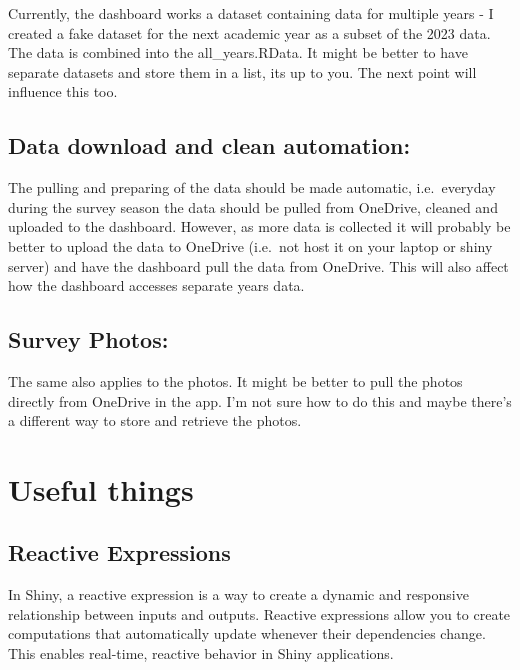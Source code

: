 \documentclass[
]{book}
\begin{document}
Currently, the dashboard works a dataset containing data for multiple years - I created a fake dataset for the next academic year as a subset of the 2023 data. The data is combined into the all\_years.RData. It might be better to have separate datasets and store them in a list, its up to you. The next point will influence this too.

\hypertarget{data-download-and-clean-automation}{%
\section{Data download and clean automation:}\label{data-download-and-clean-automation}}

The pulling and preparing of the data should be made automatic, i.e.~everyday during the survey season the data should be pulled from OneDrive, cleaned and uploaded to the dashboard. However, as more data is collected it will probably be better to upload the data to OneDrive (i.e.~not host it on your laptop or shiny server) and have the dashboard pull the data from OneDrive. This will also affect how the dashboard accesses separate years data.

\hypertarget{survey-photos}{%
\section{Survey Photos:}\label{survey-photos}}

The same also applies to the photos. It might be better to pull the photos directly from OneDrive in the app. I'm not sure how to do this and maybe there's a different way to store and retrieve the photos.

\hypertarget{useful-things}{%
\chapter{Useful things}\label{useful-things}}

\hypertarget{reactive-expressions}{%
\section{Reactive Expressions}\label{reactive-expressions}}

In Shiny, a reactive expression is a way to create a dynamic and responsive relationship between inputs and outputs. Reactive expressions allow you to create computations that automatically update whenever their dependencies change. This enables real-time, reactive behavior in Shiny applications.
\end{document}

